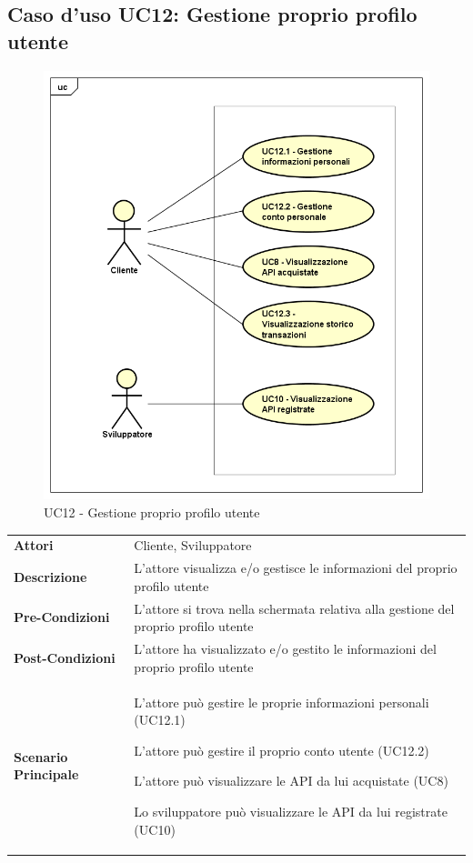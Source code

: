 \newpage
\subsection{Caso d'uso UC12: Gestione proprio profilo utente}
\label{UC12}
\begin{figure}[ht]
	\centering
	\includegraphics[scale=0.45]{UML/UC12.png}
	\caption{UC12 - Gestione proprio profilo utente}
\end{figure}

\begin{longtable}{ l | p{11cm}}
	\hline
	\rowcolor{Gray}
	\multicolumn{2}{c}{UC12 - Gestione proprio profilo utente} \\
	\hline
	\textbf{Attori} & Cliente, Sviluppatore \\
	\textbf{Descrizione} & L'attore visualizza e/o gestisce le informazioni del proprio profilo utente \\
	\textbf{Pre-Condizioni} & L'attore si trova nella schermata relativa alla gestione del proprio profilo utente \\
	\textbf{Post-Condizioni} & L'attore ha visualizzato e/o gestito le informazioni del proprio profilo utente \\
	\textbf{Scenario Principale} & 
	\begin{enumerate*}[label=(\arabic*.),itemjoin={\newline}]
		\item L'attore può gestire le proprie informazioni personali (UC12.1)
		\item L'attore può gestire il proprio conto utente (UC12.2)
		\item L'attore può visualizzare le API da lui acquistate (UC8)
		\item Lo sviluppatore può visualizzare le API da lui registrate (UC10)
	\end{enumerate*}\\
\end{longtable}

